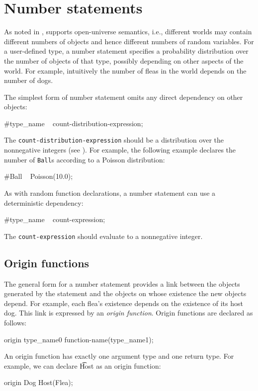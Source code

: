 \documentclass[12pt]{article}
\begin{document}
\section{Number statements}\label{number-section}
As noted in , \bl supports open-universe semantics, i.e., different worlds may contain different numbers of objects and hence different numbers of random variables.
For a user-defined type, a number statement specifies a probability distribution over the number of objects of that type, possibly depending
on other aspects of the world. For example, intuitively the number of fleas in the world depends on the number of dogs.

The simplest form of number statement omits any direct dependency on other objects:
\begin{blogcode}
#type_name ~ count-distribution-expression;
\end{blogcode}
The {\tt count-distribution-expression} should be a distribution over
the nonnegative integers (see ).
For example, the following example declares the number of \texttt{Ball}s according to a Poisson distribution:
\begin{blogcode}
#Ball ~ Poisson(10.0);
\end{blogcode}
As with random function declarations, a number statement can use a deterministic dependency:
\begin{blogcode}
#type_name ~ count-expression;
\end{blogcode}

The {\tt count-expression} should evaluate to a nonnegative integer.

\subsection{Origin functions}\label{origin-section}
The general form for a number statement provides a link between the objects generated by the statement
and the objects on whose existence the new objects depend. For example, each flea's existence
depends on the existence of its host dog. This link is expressed by an {\em origin function}.
Origin functions are declared as follows:
\begin{blogcode}
origin type_name0 function-name(type_name1);
\end{blogcode}
An origin function has exactly one argument type and one return type.  
For example, we can declare {\t Host} as an origin function:
\begin{blogcode}
origin Dog Host(Flea);
\end{blogcode}
\end{document}
